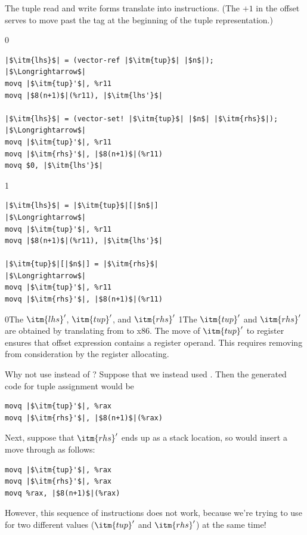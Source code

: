 \documentclass[7x10]{TimesAPriori_MIT}%
\def\racketEd{0}
\def\pythonEd{1}
\def\edition{0}
\newcommand{\racket}[1]{{\if\edition\racketEd{#1}\fi}}
\newcommand{\python}[1]{{\if\edition\pythonEd #1\fi}}
\numberwithin{theorem}{chapter}
\numberwithin{definition}{chapter}
\numberwithin{equation}{chapter}
\begin{document}
The tuple read and write forms translate into 
instructions.  (The $+1$ in the offset serves to move past the tag at the
beginning of the tuple representation.)
%
\begin{center}
\begin{minipage}{\textwidth}
{\if\edition\racketEd    
\begin{lstlisting}
|$\itm{lhs}$| = (vector-ref |$\itm{tup}$| |$n$|);
|$\Longrightarrow$|
movq |$\itm{tup}'$|, %r11
movq |$8(n+1)$|(%r11), |$\itm{lhs'}$|

|$\itm{lhs}$| = (vector-set! |$\itm{tup}$| |$n$| |$\itm{rhs}$|);
|$\Longrightarrow$|
movq |$\itm{tup}'$|, %r11
movq |$\itm{rhs}'$|, |$8(n+1)$|(%r11)
movq $0, |$\itm{lhs'}$|
\end{lstlisting}
\fi}
{\if\edition\pythonEd    
\begin{lstlisting}
|$\itm{lhs}$| = |$\itm{tup}$|[|$n$|]
|$\Longrightarrow$|
movq |$\itm{tup}'$|, %r11
movq |$8(n+1)$|(%r11), |$\itm{lhs'}$|

|$\itm{tup}$|[|$n$|] = |$\itm{rhs}$|
|$\Longrightarrow$|
movq |$\itm{tup}'$|, %r11
movq |$\itm{rhs}'$|, |$8(n+1)$|(%r11)
\end{lstlisting}
\fi}
\end{minipage}
\end{center}
\racket{The $\itm{lhs}'$, $\itm{tup}'$, and $\itm{rhs}'$}
\python{The $\itm{tup}'$ and $\itm{rhs}'$}
are obtained by translating from \LangCVec{} to x86.
%
The move of $\itm{tup}'$ to
register  ensures that offset expression
 contains a register operand.  This requires
removing  from consideration by the register allocating.

Why not use  instead of ? Suppose that we instead used
. Then the generated code for tuple assignment would be
\begin{lstlisting}
movq |$\itm{tup}'$|, %rax
movq |$\itm{rhs}'$|, |$8(n+1)$|(%rax)
\end{lstlisting}
Next, suppose that $\itm{rhs}'$ ends up as a stack location, so
 would insert a move through 
as follows:
\begin{lstlisting}
movq |$\itm{tup}'$|, %rax
movq |$\itm{rhs}'$|, %rax
movq %rax, |$8(n+1)$|(%rax)
\end{lstlisting}
However, this sequence of instructions does not work, because we're
trying to use  for two different values ($\itm{tup}'$ and
$\itm{rhs}'$) at the same time!
\end{document}

